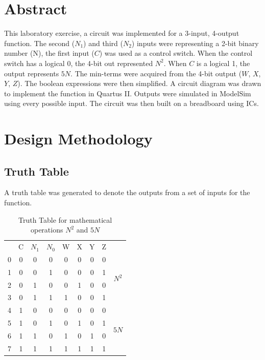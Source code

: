 \documentclass[CMPE]{KGCOEReport}
\begin{document}
\maketitle

\section*{Abstract}
This laboratory exercise, a circuit was implemented for a 3-input, 4-output function. The second (\(N_1\)) and third (\(N_2\)) inputs were representing a 2-bit binary number (N), the first input (\(C\)) was used as a control switch. When the control switch has a logical 0, the 4-bit out represented \(N^2\). When \(C\) is a logical 1, the output represents \(5N\). The min-terms were acquired from the 4-bit output (\(W\), \(X\), \(Y\), \(Z\)). The boolean expressions were then simplified. A circuit diagram was drawn to implement the function in Quartus II. Outputs were simulated in ModelSim using every possible input. The circuit was then built on a breadboard using ICs.

\section*{Design Methodology}

\subsection*{Truth Table}

A truth table was generated to denote the outputs from a set of inputs for the function.

\begin{table}[h]
\renewcommand{\arraystretch}{1.2}
\setlength{\tabcolsep}{12pt}
\caption{Truth Table for mathematical operations \(N^2\) and \(5N\)}
\begin{center}
\begin{tabular}{c|c|c|c||c|c|c|c|c}
\cline{2-8}
& C & \(N_1\) & \(N_0\) & W & X & Y & Z & \\\cline{2-8}
{\scriptsize 0} & 0 & 0 & 0 & 0 & 0 & 0 & 0 & \multirow{4}{*}{\(N^2\)}\\\cline{2-8}
{\scriptsize 1} & 0 & 0 & 1 & 0 & 0 & 0 & 1\\\cline{2-8}
{\scriptsize 2} & 0 & 1 & 0 & 0 & 1 & 0 & 0\\\cline{2-8}
{\scriptsize 3} & 0 & 1 & 1 & 1 & 0 & 0 & 1\\\cline{2-9}
{\scriptsize 4} & 1 & 0 & 0 & 0 & 0 & 0 & 0 & \multirow{4}{*}{\(5N\)}\\\cline{2-8}
{\scriptsize 5} & 1 & 0 & 1 & 0 & 1 & 0 & 1\\\cline{2-8}
{\scriptsize 6} & 1 & 1 & 0 & 1 & 0 & 1 & 0\\\cline{2-8}
{\scriptsize 7} & 1 & 1 & 1 & 1 & 1 & 1 & 1\\\cline{2-8}

\end{tabular}
\end{center}
\label{tab:TRUTH}
\end{table}
\end{document}
